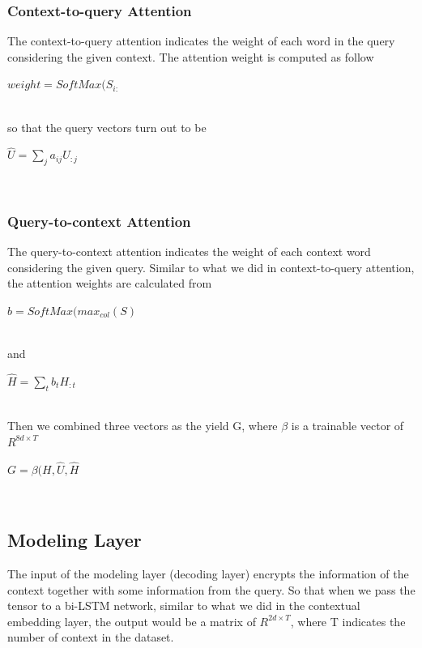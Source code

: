 \documentclass{article} %
\begin{document}
\subsubsection{Context-to-query Attention}

The context-to-query attention indicates the weight of each word in the query considering the given context. The attention weight is computed as follow\\
\newline
\centerline{$weight=SoftMax(S_{i:}$}\\
\newline
so that the query vectors turn out to be\\
\newline
\centerline{$\hat{U}=\sum_j a_{ij}U_{:j}$}\\

\subsubsection{Query-to-context Attention}

The query-to-context attention indicates the weight of each context word considering the given query. Similar to what we did in context-to-query attention, the attention weights are calculated from\\
\newline
\centerline{$b=SoftMax(max_{col}(S)$}\\
\newline
and
\newline
\centerline{$\hat{H}=\sum_tb_tH_{:t}$}\\
\newline
Then we combined three vectors as the yield G, where $\beta$ is a trainable vector of $R^{8d\times T}$\\
\newline
\centerline{$G=\beta (H, \hat{U}, \hat{H}$}\\

\subsection{Modeling Layer}

The input of the modeling layer (decoding layer) encrypts the information of the context together with some information from the query. So that when we pass the tensor to a bi-LSTM network, similar to what we did in the contextual embedding layer, the output would be a matrix of $R^{2d\times T}$, where T indicates the number of context in the dataset.
\end{document}
